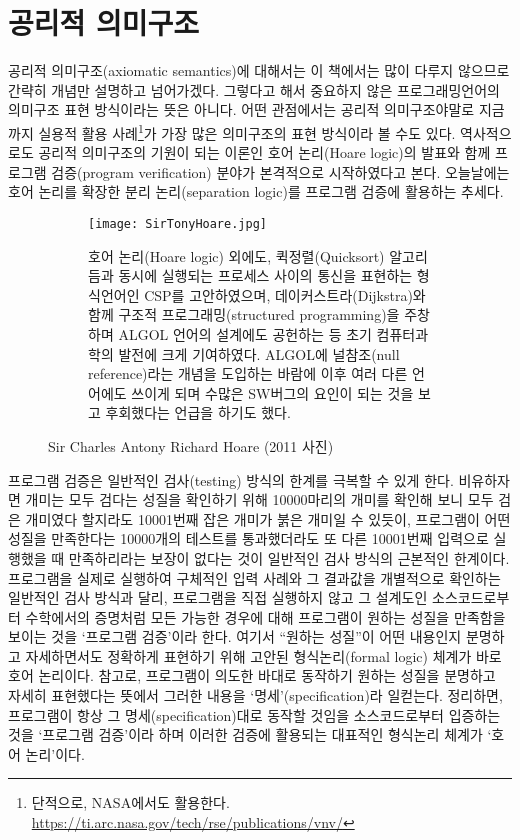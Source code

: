 \section{공리적 의미구조}
%
%
%
%
공리적 의미구조(axiomatic semantics)에 대해서는 이 책에서는 많이 다루지
않으므로 간략히 개념만 설명하고 넘어가겠다. 그렇다고 해서 중요하지 않은
프로그래밍언어의 의미구조 표현 방식이라는 뜻은 아니다. 어떤 관점에서는
공리적 의미구조야말로 지금까지 실용적 활용 사례\footnote{단적으로,
  NASA에서도 활용한다.
  \url{https://ti.arc.nasa.gov/tech/rse/publications/vnv/}}가 가장 많은
의미구조의 표현 방식이라 볼 수도 있다. 역사적으로도 공리적 의미구조의
기원이 되는 이론인 호어 논리(Hoare logic)\cite{Hoare69}의 발표와 함께
프로그램 검증(program verification) 분야가 본격적으로
시작하였다\cite{GSLeeHJKim20Hoare}고 본다. 오늘날에는 호어 논리를
확장한 분리 논리(separation logic)\cite{IshtiaqOHearn01,
OHearnReynoldsYang01}를 프로그램 검증에 활용하는 추세다.

\begin{figure}
\begin{subfigure}{.33\textwidth}
\texttt{[image: SirTonyHoare.jpg]}
\end{subfigure}
\begin{subfigure}{.65\textwidth}\small
호어 논리(Hoare logic) 외에도, 퀵정렬(Quicksort) 알고리듬과
동시에 실행되는 프로세스 사이의 통신을 표현하는 형식언어인
CSP를 고안하였으며, 데이커스트라(Dijkstra)와 함께
구조적 프로그래밍(structured programming)을 주창하며
ALGOL 언어의 설계에도 공헌하는 등 초기 컴퓨터과학의 발전에
크게 기여하였다. ALGOL에 널참조(null reference)라는 개념을
도입하는 바람에 이후 여러 다른 언어에도 쓰이게 되며 수많은
SW버그의 요인이 되는 것을 보고 후회했다는 언급을 하기도 했다.
\end{subfigure}
\caption{Sir Charles Antony Richard Hoare (2011 사진) \label{fig:Hoare}}
\end{figure}


프로그램 검증은 일반적인 검사(testing) 방식의 한계를 극복할 수 있게 한다.
비유하자면 개미는 모두 검다는 성질을 확인하기 위해 10000마리의 개미를
확인해 보니 모두 검은 개미였다 할지라도 10001번째 잡은 개미가 붉은
개미일 수 있듯이, 프로그램이 어떤 성질을 만족한다는 10000개의 테스트를
통과했더라도 또 다른 10001번째 입력으로 실행했을 때 만족하리라는 보장이
없다는 것이 일반적인 검사 방식의 근본적인 한계이다. 프로그램을 실제로
실행하여 구체적인 입력 사례와 그 결과값을 개별적으로 확인하는 일반적인
검사 방식과 달리, 프로그램을 직접 실행하지 않고 그 설계도인 소스코드로부터
수학에서의 증명처럼 모든 가능한 경우에 대해 프로그램이 원하는 성질을
만족함을 보이는 것을 `프로그램 검증'이라 한다. 여기서 ``원하는 성질''이
어떤 내용인지 분명하고 자세하면서도 정확하게 표현하기 위해 고안된
형식논리(formal logic) 체계가 바로 호어 논리이다. 참고로, 프로그램이
의도한 바대로 동작하기 원하는 성질을 분명하고 자세히 표현했다는 뜻에서
그러한 내용을 `명세'(specification)라 일컫는다. 정리하면, 프로그램이
항상 그 명세(specification)대로 동작할 것임을 소스코드로부터 입증하는
것을 `프로그램 검증'이라 하며 이러한 검증에 활용되는 대표적인 형식논리
체계가 `호어 논리'이다.

